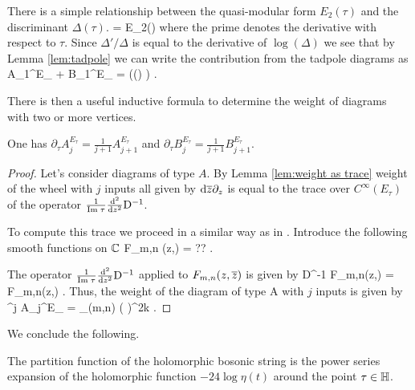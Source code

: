 There is a simple relationship between the quasi-modular form $E_2(\tau)$ and the discriminant $\Delta(\tau)$. 
\ben
{}  = E_2(\tau)
\een
where the prime denotes the derivative with respect to $\tau$. 
Since $\Delta'/\Delta$ is equal to the derivative of $\log(\Delta)$ we see that by Lemma \ref{lem:tadpole} we can write the contribution from the tadpole diagrams as
\ben 
\epsilon A_1^{E_\tau} + \epsilon B_1^{E_\tau} = \frac{\d}{\d \tau} \left(\log \Delta(\tau) \right) .
\een 

\begin{lem}\label{lem:weight as trace}
\end{lem}

There is then a useful inductive formula to determine the weight of diagrams with two or more vertices.


\begin{lem} 
One has $\partial_\tau A^{E_\tau}_{j} = \frac{1}{j+1} A^{E_\tau}_{j+1}$ and $\partial_\tau B_j^{E_\tau} = \frac{1}{j+1} B_{j+1}^{E_\tau}$.
\end{lem}
\begin{proof} 
Let's consider diagrams of type $A$. 
By Lemma \ref{lem:weight as trace} weight of the wheel with $j$ inputs all given by ${\rm d}\overline{z} \partial_z$ is equal to the trace over $C^\infty(E_\tau)$ of the operator $\frac{1}{{\rm Im}\; \tau} \frac{{\rm d}^2}{{\rm d} z^2} {\rm D}^{-1}$.

To compute this trace we proceed in a similar way as in \cite{wg2}. 
Introduce the following smooth functions on $\mathbb C$
\ben
F_{m,n} (z,\zbar) = ?? .
\een 

The operator $\frac{1}{{\rm Im}\; \tau} \frac{{\rm d}^2}{{\rm d} z^2} {\rm D}^{-1}$ applied to $F_{m,n}(z,\overline{z})$ is given by
\ben
{}  {\rm D}^{-1} F_{m,n}(z,\zbar) =   F_{m,n}(z,\zbar) .
\een 
Thus, the weight of the diagram of type A with $j$ inputs is given by 
\ben
\epsilon^{j} A_{j}^{E_\tau} =  \sum_{(m,n) \in \ZZ \times \ZZ} \left(  \right)^{2k} .
\een
\end{proof}

We conclude the following. 

\begin{prop} The partition function of the holomorphic bosonic string is the power series expansion of the holomorphic function $-24 \log \eta (t)$ around the point $\tau \in \mathbb H$. 
\end{prop}

